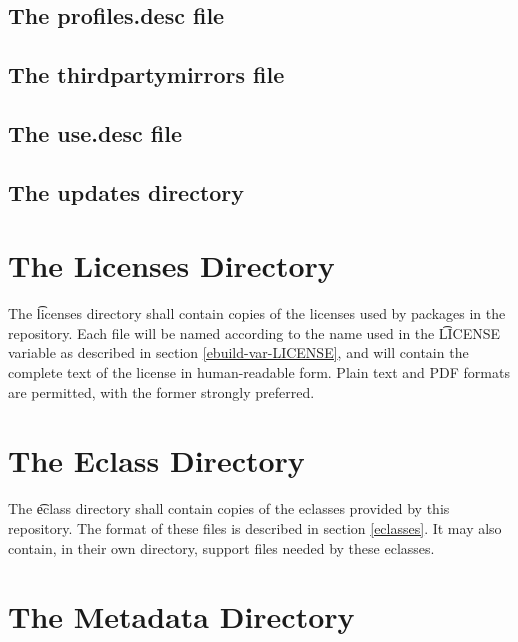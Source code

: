 \subsection{The profiles.desc file}
\label{profiles.desc}

\subsection{The thirdpartymirrors file}
\label{thirdpartymirrors}

\subsection{The use.desc file}
\label{use.desc}

\subsection{The updates directory}
\label{updates-dir}

\section{The Licenses Directory}
\label{licenses-dir}

The \t{licenses} directory shall contain copies of the licenses used by packages in the
repository. Each file will be named according to the name used in the \t{LICENSE} variable as
described in section \ref{ebuild-var-LICENSE}, and will contain the complete text of the license in
human-readable form. Plain text and PDF formats are permitted, with the former strongly preferred.

\section{The Eclass Directory}
\label{eclass-dir}

The \t{eclass} directory shall contain copies of the eclasses provided by this repository. The
format of these files is described in section \ref{eclasses}. It may also contain, in their own
directory, support files needed by these eclasses.

\section{The Metadata Directory}
\label{metadata-dir}

